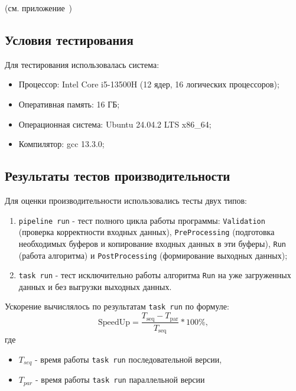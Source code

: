 \documentclass[12pt]{article}
\begin{document}
(см. приложение~)

\subsection{Условия тестирования}
Для тестирования использовалась система:
\begin{itemize}
    \item Процессор: Intel Core i5-13500H (12 ядер, 16 логических процессоров);
    \item Оперативная память: 16 ГБ;
    \item Операционная система: Ubuntu 24.04.2 LTS x86\_64;  
    \item Компилятор: gcc 13.3.0;
\end{itemize}

\subsection{Результаты тестов производительности}

Для оценки производительности использовались тесты двух типов:
\begin{enumerate}
    \item \texttt{pipeline run} - тест полного цикла работы программы: \texttt{Validation} (проверка корректности входных данных), \texttt{PreProcessing} (подготовка необходимых буферов и копирование входных данных в эти буферы), \texttt{Run} (работа алгоритма) и \texttt{PostProcessing} (формирование выходных данных);
    \item \texttt{task run} - тест исключительно работы алгоритма \texttt{Run} на уже загруженных данных и без выгрузки выходных данных.
\end{enumerate}

Ускорение вычислялось по результатам \texttt{task run} по формуле:
\[
\text{SpeedUp} = \frac{T_{\text{seq}} - T_{\text{par}}}{T_{\text{seq}}} * 100\%,
\]
где
\begin{itemize}
    \item \(T_{seq}\) - время работы \texttt{task run} последовательной версии,
    \item \(T_{par}\) - время работы \texttt{task run} параллельной версии
\end{itemize}
\end{document}
